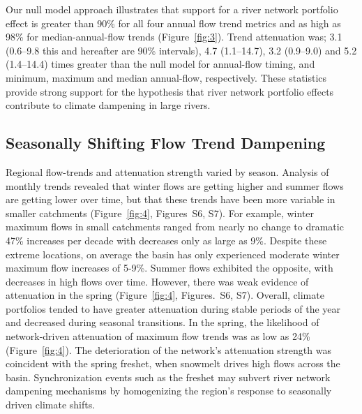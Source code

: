 \documentclass[draft,linenumbers]{AGUJournal}
\begin{document}
Our null model approach illustrates that support for a river network portfolio effect is greater than 90\% for all four annual flow trend metrics and as high as 98\% for median-annual-flow trends (Figure~\ref{fig:3}). Trend attenuation was; 3.1 (0.6--9.8 this and hereafter are 90\% intervals), 4.7 (1.1--14.7), 3.2 (0.9--9.0) and 5.2 (1.4--14.4) times greater than the null model for annual-flow timing, and minimum, maximum and median annual-flow, respectively. These statistics provide strong support for the hypothesis that river network portfolio effects contribute to climate dampening in large rivers.

\subsection{Seasonally Shifting Flow Trend Dampening}

Regional flow-trends and attenuation strength varied by season. Analysis of monthly trends revealed that winter flows are getting higher and summer flows are getting lower over time, but that these trends have been more variable in smaller catchments (Figure~\ref{fig:4}, Figures~S6, S7). For example, winter maximum flows in small catchments ranged from nearly no change to dramatic 47\% increases per decade with decreases only as large as 9\%. Despite these extreme locations, on average the basin has only experienced moderate winter maximum flow increases of 5-9\%. Summer flows exhibited the opposite, with decreases in high flows over time. However, there was weak evidence of attenuation in the spring (Figure~\ref{fig:4}, Figures.~S6, S7). Overall, climate portfolios tended to have greater attenuation during stable periods of the year and decreased during seasonal transitions. In the spring, the likelihood of network-driven attenuation of maximum flow trends was as low as 24\% (Figure~\ref{fig:4}). The deterioration of the network's attenuation strength was coincident with the spring freshet, when snowmelt drives high flows across the basin. Synchronization events such as the freshet may subvert river network dampening mechanisms by homogenizing the region's response to seasonally driven climate shifts.
 
\end{document}
